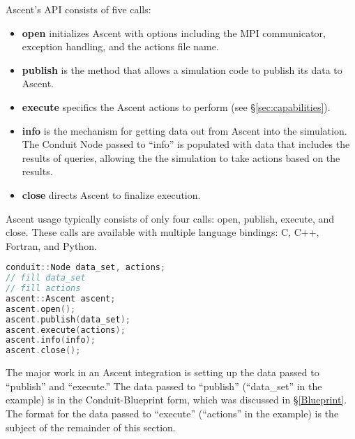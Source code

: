 %

Ascent's API consists of five calls:
%
\begin{itemize}
  \item \textbf{open} initializes Ascent with options including the
MPI communicator, exception handling, and the actions file name.
%
  \item \textbf{publish} is the method that allows a simulation code to publish its data
to Ascent.  
%
   \item \textbf{execute} specifics the Ascent actions to perform (see \S\ref{sec:capabilities}).  
%
%
  \item \textbf{info} is the mechanism for getting data out from Ascent into the simulation.
%
The Conduit Node passed to ``info'' is populated with data that includes the results
of queries, allowing the the simulation to take actions based on the results.
%
  \item \textbf{close} directs Ascent to finalize execution.
\end{itemize}

Ascent usage typically consists of only four calls: open, publish, execute, and close.
%
These calls are available with multiple language bindings: C, C++, Fortran, and Python.
%
%
\begin{lstlisting}[language=C++,caption={Typical Ascent usage in C++}]
conduit::Node data_set, actions;
// fill data_set 
// fill actions 
ascent::Ascent ascent;
ascent.open();
ascent.publish(data_set);
ascent.execute(actions);
ascent.info(info);
ascent.close();
\end{lstlisting}

The major work in an Ascent integration is setting up the data passed to ``publish'' and
``execute.''
%
The data passed to ``publish'' (``data\_set'' in the example) is in the Conduit-Blueprint form, which was discussed in \S\ref{Blueprint}.
%
The format for the data passed to ``execute'' (``actions'' in the example) 
is the subject of the remainder of this section.
%


